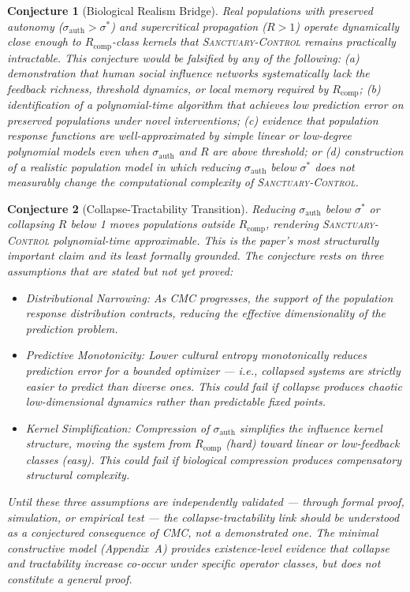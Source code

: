 \documentclass[11pt, a4paper]{article}
\newtheorem{conjecture}{Conjecture}[section]
\theoremstyle{remark}
\begin{document}
\begin{conjecture}[Biological Realism Bridge]
Real populations with preserved autonomy ($\sigma_{\text{auth}} > \sigma^*$) and supercritical propagation ($R > 1$) operate dynamically close enough to $R_{\text{comp}}$-class kernels that \textsc{Sanctuary-Control} remains practically intractable. This conjecture would be falsified by any of the following: (a) demonstration that human social influence networks systematically lack the feedback richness, threshold dynamics, or local memory required by $R_{\text{comp}}$; (b) identification of a polynomial-time algorithm that achieves low prediction error on preserved populations under novel interventions; (c) evidence that population response functions are well-approximated by simple linear or low-degree polynomial models even when $\sigma_{\text{auth}}$ and $R$ are above threshold; or (d) construction of a realistic population model in which reducing $\sigma_{\text{auth}}$ below $\sigma^*$ does not measurably change the computational complexity of \textsc{Sanctuary-Control}.
\end{conjecture}

\begin{conjecture}[Collapse-Tractability Transition]
Reducing $\sigma_{\text{auth}}$ below $\sigma^*$ or collapsing $R$ below 1 moves populations outside $R_{\text{comp}}$, rendering \textsc{Sanctuary-Control} polynomial-time approximable. This is the paper's most structurally important claim and its least formally grounded. The conjecture rests on three assumptions that are stated but not yet proved:

\begin{itemize}
\item \emph{Distributional Narrowing:} As CMC progresses, the support of the population response distribution contracts, reducing the effective dimensionality of the prediction problem.
\item \emph{Predictive Monotonicity:} Lower cultural entropy monotonically reduces prediction error for a bounded optimizer --- i.e., collapsed systems are strictly easier to predict than diverse ones. This could fail if collapse produces chaotic low-dimensional dynamics rather than predictable fixed points.
\item \emph{Kernel Simplification:} Compression of $\sigma_{\text{auth}}$ simplifies the influence kernel structure, moving the system from $R_{\text{comp}}$ (hard) toward linear or low-feedback classes (easy). This could fail if biological compression produces compensatory structural complexity.
\end{itemize}

Until these three assumptions are independently validated --- through formal proof, simulation, or empirical test --- the collapse-tractability link should be understood as a conjectured consequence of CMC, not a demonstrated one. The minimal constructive model (Appendix~A) provides existence-level evidence that collapse and tractability increase co-occur under specific operator classes, but does not constitute a general proof.
\end{conjecture}
\end{document}

